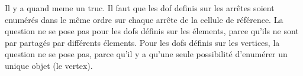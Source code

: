 Il y a quand meme un truc. Il faut que les dof definis sur les
arr\^etes soient enum\'er\'es dans le m\^eme ordre sur chaque arr\^ete de
la cellule de r\'ef\'erence. La question ne se pose pas pour les dofs
d\'efinis sur les \'elements, parce qu'ils ne sont par partag\'es par
diff\'erents \'elements. Pour les dofs d\'efinis sur les vertices, la
question ne se pose pas, parce qu'il y a qu'une seule possibilit\'e
d'enum\'erer un unique objet (le vertex). 
